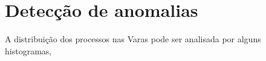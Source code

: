 \chapter{Detecção de anomalias}\label{cap_trabalho_academico}


A distribuição dos processos nas Varas pode ser analisada por alguns histogramas, 

